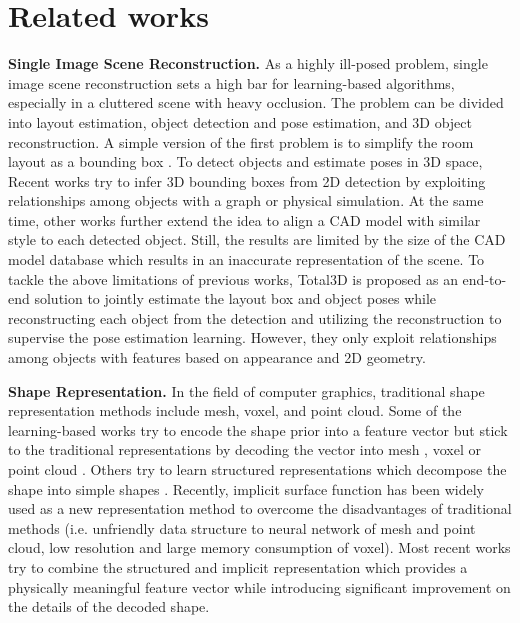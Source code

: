 \documentclass[final]{cvpr}
\begin{document}
\section{Related works}

\noindent\textbf{Single Image Scene Reconstruction.}
As a highly ill-posed problem, single image scene reconstruction sets a high bar for learning-based algorithms, especially in a cluttered scene with heavy occlusion. 
The problem can be divided into layout estimation, object detection and pose estimation, and 3D object reconstruction. 
A simple version of the first problem is to simplify the room layout as a bounding box \cite{hedau2009recovering, lee2009geometric, mallya2015learning, dasgupta2016delay, ren2016coarse}. 
To detect objects and estimate poses in 3D space, Recent works \cite{du2018learning, huang2018cooperative, chen2019holistic++} try to infer 3D bounding boxes from 2D detection by exploiting relationships among objects with a graph or physical simulation.
At the same time, other works \cite{izadinia2017im2cad, hueting2017seethrough, huang2018holistic} further extend the idea to align a CAD model with similar style to each detected object.
Still, the results are limited by the size of the CAD model database which results in an inaccurate representation of the scene.
To tackle the above limitations of previous works, Total3D \cite{nie2020total3dunderstanding} is proposed as an end-to-end solution to jointly estimate the layout box and object poses while reconstructing each object from the detection and utilizing the reconstruction to supervise the pose estimation learning.
However, they only exploit relationships among objects with features based on appearance and 2D geometry.

\noindent\textbf{Shape Representation.}
In the field of computer graphics, traditional shape representation methods include mesh, voxel, and point cloud. 
Some of the learning-based works try to encode the shape prior into a feature vector but stick to the traditional representations by decoding the vector into mesh \cite{groueix2018papier, wang2018pixel2mesh, pan2019deep, smith2019geometrics, gkioxari2019mesh}, voxel \cite{wu20153d, choy20163d, brock2016generative, wu2016learning, stutz2018learning} or point cloud \cite{lin2017learning, achlioptas2018learning, yang2019pointflow}. 
Others try to learn structured representations which decompose the shape into simple shapes \cite{li2017grass, gao2019sdm, paschalidou2019superquadrics}. 
Recently, implicit surface function \cite{mescheder2019occupancy, park2019deepsdf, xu2019disn, saito2019pifu, peng2020convolutional, saito2020pifuhd} has been widely used as a new representation method to overcome the disadvantages of traditional methods (i.e. unfriendly data structure to neural network of mesh and point cloud, low resolution and large memory consumption of voxel). 
Most recent works \cite{genova2019learning, genova2020local, wu2020pq} try to combine the structured and implicit representation which provides a physically meaningful feature vector while introducing significant improvement on the details of the decoded shape.
\end{document}
